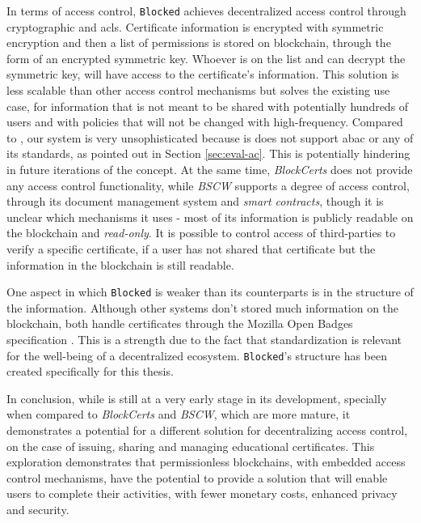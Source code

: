 In terms of access control, \texttt{Blocked} achieves decentralized access control through cryptographic and \gls{acl}s. Certificate information is encrypted with symmetric encryption and then a list of permissions is stored on blockchain, through the form of an encrypted symmetric key. Whoever is on the list and can decrypt the symmetric key, will have access to the certificate's information. This solution is less scalable than other access control mechanisms but solves the existing use case, for information that is not meant to be shared with potentially hundreds of users and with policies that will not be changed with high-frequency. Compared to \citeauthor{maesa_blockchain_2017} \cite{maesa_blockchain_2017}, our system is very unsophisticated because is does not support \gls{abac} or any of its standards, as pointed out in Section \ref{sec:eval-ac}. This is potentially hindering in future iterations of the concept. At the same time, \emph{BlockCerts} does not provide any access control functionality, while \emph{BSCW} supports a degree of access control, through its document management system and \emph{smart contracts}, though it is unclear which mechanisms it uses - most of its information is publicly readable on the blockchain and \emph{read-only}. It is possible to control access of third-parties to verify a specific certificate, if a user has not shared that certificate but the information in the blockchain is still readable.

One aspect in which \texttt{Blocked} is weaker than its counterparts is in the structure of the information. Although other systems don't stored much information on the blockchain, both handle certificates through the Mozilla Open Badges specification \cite{openbadges}. This is a strength due to the fact that standardization is relevant for the well-being of a decentralized ecosystem. \texttt{Blocked}'s structure has been created specifically for this thesis.

In conclusion, while  is still at a very early stage in its development, specially when compared to \emph{BlockCerts} and \emph{BSCW}, which are more mature, it demonstrates a potential for a different solution for decentralizing access control, on the case of issuing, sharing and managing educational certificates. This exploration demonstrates that permissionless blockchains, with embedded access control mechanisms, have the potential to provide a solution that will enable users to complete their activities, with fewer monetary costs, enhanced privacy and security. 

